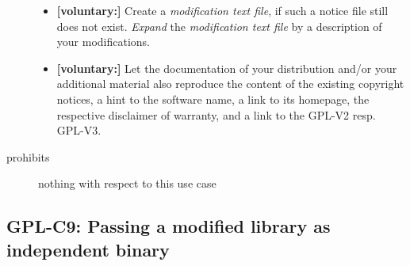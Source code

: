 \begin{description}
\begin{itemize}
  \item \textbf{[voluntary:]} Create a \emph{modification text file}, if such a
  notice file still does not exist. \emph{Expand} the \emph{modification text
  file} by a description of your modifications.
  
  \item \textbf{[voluntary:]} Let the documentation of your distribution and/or
  your additional material also reproduce the content of the existing
  copyright notices, a hint to the software name, a link to its homepage,
  the respective disclaimer of warranty, and a link to the GPL-V2 resp.
  GPL-V3.

\end{itemize}

\item[prohibits] nothing with respect to this use case

\end{description}


\subsection{GPL-C9: Passing a modified library as independent binary}
\label{OSUC-08B-GPL}

